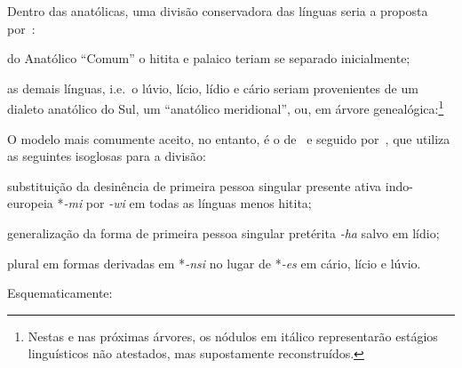 Dentro das anatólicas, uma divisão conservadora das línguas seria a proposta
por~\citet[305--6]{Rieken2017}:
\begin{inparaenum}
	\item do Anatólico ``Comum'' o hitita e palaico teriam se separado
	inicialmente;
	\item as demais línguas, i.e.\ o lúvio, lício, lídio e cário seriam
	provenientes de um dialeto anatólico do Sul, um
	``anatólico meridional'', ou, em árvore genealógica:\footnote{Nestas e nas
		próximas árvores, os nódulos em itálico representarão estágios linguísticos
		não atestados, mas supostamente reconstruídos.}
\end{inparaenum}

\vspace{3pt}
\begin{center}
\end{center}

O modelo mais comumente aceito, no entanto, é o de~\citet[92]{Oettinger1978} e
seguido por~\citet[6]{Yakubovich2010}, que utiliza as seguintes isoglosas para a
divisão:
\begin{inparaenum}
	\item substituição da desinência de primeira pessoa singular presente ativa
	indo-europeia *\emph{-mi} por \emph{-wi} em todas as línguas menos hitita;
	\item generalização da forma de primeira pessoa singular pretérita \emph{-ha}
	salvo em lídio;
	\item plural em formas derivadas em *\emph{-nsi} no lugar de *\emph{-es} em
	cário, lício e lúvio.
\end{inparaenum}
Esquematicamente:

\begin{center}
\end{center}

